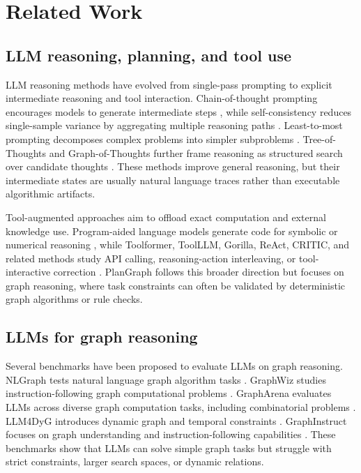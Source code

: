 \documentclass[pdflatex,iicol,sn-mathphys-num]{sn-jnl}
\theoremstyle{thmstyleone}
\theoremstyle{thmstyletwo}
\theoremstyle{thmstylethree}
\begin{document}
\section{Related Work}\label{sec:related}

\subsection{LLM reasoning, planning, and tool use}

LLM reasoning methods have evolved from single-pass prompting to explicit intermediate reasoning and tool interaction. Chain-of-thought prompting encourages models to generate intermediate steps \cite{wei2022chain}, while self-consistency reduces single-sample variance by aggregating multiple reasoning paths \cite{wang2023selfconsistency}. Least-to-most prompting decomposes complex problems into simpler subproblems \cite{zhou2023least}. Tree-of-Thoughts and Graph-of-Thoughts further frame reasoning as structured search over candidate thoughts \cite{yao2023tree,besta2024graph}. These methods improve general reasoning, but their intermediate states are usually natural language traces rather than executable algorithmic artifacts.

Tool-augmented approaches aim to offload exact computation and external knowledge use. Program-aided language models generate code for symbolic or numerical reasoning \cite{gao2023pal}, while Toolformer, ToolLLM, Gorilla, ReAct, CRITIC, and related methods study API calling, reasoning-action interleaving, or tool-interactive correction \cite{schick2023toolformer,qin2023toolllm,gorilla2024,yao2023react,critic2024}. PlanGraph follows this broader direction but focuses on graph reasoning, where task constraints can often be validated by deterministic graph algorithms or rule checks.

\subsection{LLMs for graph reasoning}

Several benchmarks have been proposed to evaluate LLMs on graph reasoning. NLGraph tests natural language graph algorithm tasks \cite{chen2024nlgraph}. GraphWiz studies instruction-following graph computational problems \cite{gong2024graphwiz}. GraphArena evaluates LLMs across diverse graph computation tasks, including combinatorial problems \cite{tang2025grapharena}. LLM4DyG introduces dynamic graph and temporal constraints \cite{llm4dyg2024}. GraphInstruct focuses on graph understanding and instruction-following capabilities \cite{graphinstruct2024}. These benchmarks show that LLMs can solve simple graph tasks but struggle with strict constraints, larger search spaces, or dynamic relations.
\end{document}
